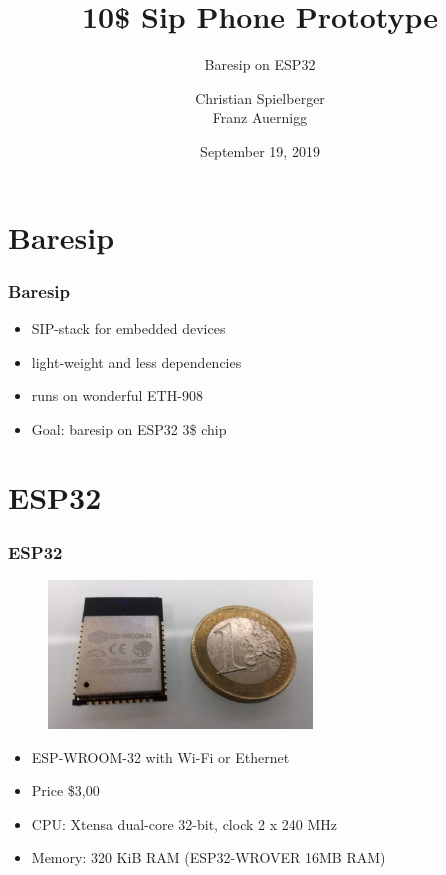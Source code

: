 \documentclass{beamer}
\title{10\$ Sip Phone Prototype}
\subtitle{Baresip on ESP32}
\author{Christian Spielberger\\Franz Auernigg}
\date{September 19, 2019}
\begin{document}

\maketitle

\section{Baresip}
\begin{frame}
\frametitle{Baresip}
\begin{itemize}
\item SIP-stack for embedded devices
  
\item light-weight and less dependencies

\item runs on wonderful ETH-908
\vspace{10mm}
\item Goal: baresip on ESP32 3\$ chip
\end{itemize}
\end{frame}


 \section{ESP32}

\begin{frame}
\frametitle{ESP32}
\begin{figure}
  \includegraphics[width=7cm]{esp32.jpeg}
\end{figure}
\begin{itemize}
 \item ESP-WROOM-32 with Wi-Fi or Ethernet
 \item Price \$3,00
 \item CPU: Xtensa dual-core 32-bit, clock 2 x 240 MHz
 \item Memory: 320 KiB RAM (ESP32-WROVER 16MB RAM)
\end{itemize}
\end{frame}
\end{document}
